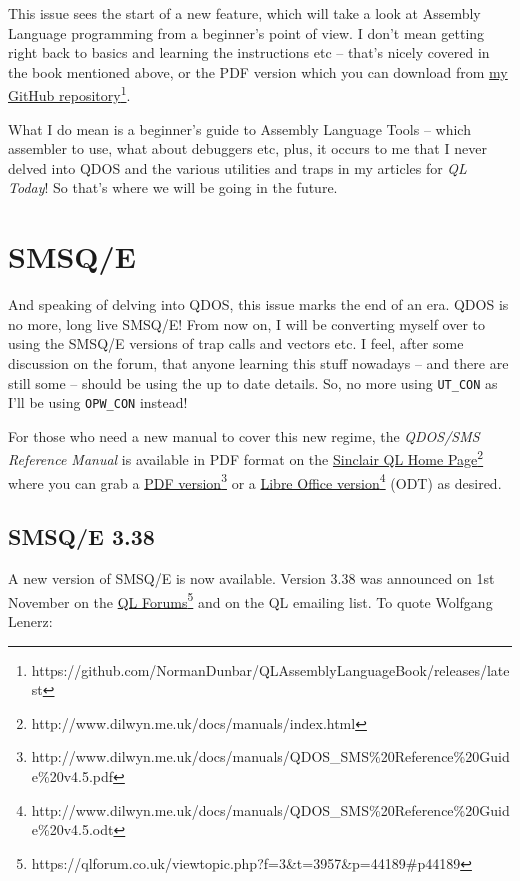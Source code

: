 This issue sees the start of a new feature, which will take a look
at Assembly Language programming from a beginner's point of view.
I don't mean getting right back to basics and learning the instructions
etc -- that's nicely covered in the book mentioned above, or the
PDF version which you can download from \href{https://github.com/NormanDunbar/QLAssemblyLanguageBook/releases/latest}{my GitHub repository}\footnote{https://github.com/NormanDunbar/QLAssemblyLanguageBook/releases/latest}. 

What I do mean is a beginner's guide to Assembly Language Tools --
which assembler to use, what about debuggers etc, plus, it occurs
to me that I never delved into QDOS and the various utilities and
traps in my articles for \emph{QL Today}! So that's where we will
be going in the future.

\section{SMSQ/E}

And speaking of delving into QDOS, this issue marks the end of an
era. QDOS is no more, long live SMSQ/E! From now on, I will be converting
myself over to using the SMSQ/E versions of trap calls and vectors
etc. I feel, after some discussion on the forum, that anyone learning
this stuff nowadays -- and there are still some -- should be using
the up to date details. So, no more using \texttt{UT\_CON} as I'll
be using \texttt{OPW\_CON} instead!

For those who need a new manual to cover this new regime, the \emph{QDOS/SMS
Reference Manual} is available in PDF format on the \href{http://www.dilwyn.me.uk/docs/manuals/index.html}{Sinclair QL Home Page}\footnote{http://www.dilwyn.me.uk/docs/manuals/index.html}
where you can grab a \href{http://www.dilwyn.me.uk/docs/manuals/QDOS_SMS\%20Reference\%20Guide\%20v4.5.pdf}{PDF version}\footnote{http://www.dilwyn.me.uk/docs/manuals/QDOS\_SMS\%20Reference\%20Guide\%20v4.5.pdf}
or a \href{http://www.dilwyn.me.uk/docs/manuals/QDOS_SMS\%20Reference\%20Guide\%20v4.5.odt}{Libre Office version}\footnote{http://www.dilwyn.me.uk/docs/manuals/QDOS\_SMS\%20Reference\%20Guide\%20v4.5.odt}
(ODT) as desired.

\subsection{SMSQ/E 3.38}

A new version of SMSQ/E is now available. Version 3.38 was announced
on 1st November on the \href{https://qlforum.co.uk/viewtopic.php?f=3&t=3957&p=44189\#p44189}{QL Forums}\footnote{https://qlforum.co.uk/viewtopic.php?f=3\&t=3957\&p=44189\#p44189}
and on the QL emailing list. To quote Wolfgang Lenerz:

